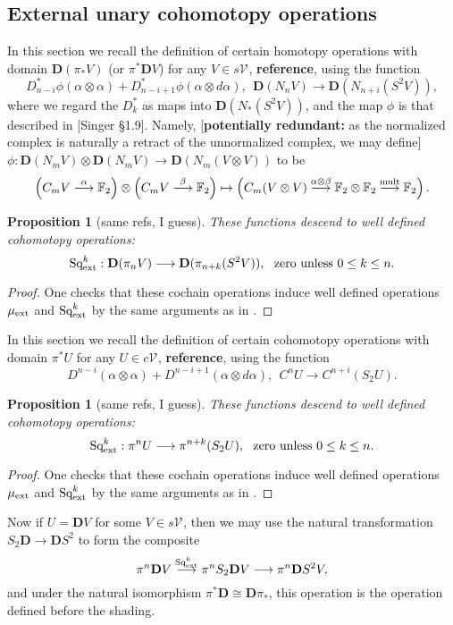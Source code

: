 \documentclass[11pt]{amsart}
\theoremstyle{plain}
\newtheorem{prop}[thm]{Proposition}
\theoremstyle{definition}
\let\oldphi\phi
\let\phi\varphi
\renewcommand{\to}{\longrightarrow}
\newcommand{\calV}{\mathcal{V}}
\theoremstyle{plain}
\newcommand{\vect}[2]{\calV^{#1}_{#2}}
\newcommand{\ExtCohOp}{\textup{Sq}_\textup{ext}}
\newcommand{\ExtCohProd}{\mu_\textup{ext}}
\newcommand{\F}{\mathbb{F}}
\newcommand{\dual}{\mathbf{D}}
\begin{document}
\begin{Constructing (co)homotopy operations}
\subsection{External unary cohomotopy operations}
In this section we recall the definition of certain homotopy operations with domain $\dual(\pi_*V)$ (or $\pi^*\dual V$) for any $V\in s\vect{}{}$, \textbf{reference}, using the function
\[D^*_{n-i}\oldphi(\alpha\otimes \alpha)+D^*_{n-i+1}\oldphi(\alpha\otimes d\alpha),\ \ \dual(N_nV) \to \dual(N_{n+i}(S^2V)),\]
where we regard the $D^*_k$ as maps into $\dual(N_*(S^2V))$, and the map $\oldphi$ is that described in [Singer \S1.9]. Namely, [\textbf{potentially redundant:} as the normalized complex is naturally a retract of the unnormalized complex, we may define] $\oldphi:\dual\left(N_mV\right)\otimes \dual\left(N_mV\right)\to \dual\left(N_m(V\otimes V)\right)$ to be
\[\left(C_mV\overset{\alpha}{\to}\F_2\right)\otimes \left(C_mV\overset{\beta}{\to}\F_2\right)\mapsto\left(C_m(V\otimes V)\overset{\alpha\otimes\beta}{\to}\F_2\otimes \F_2\overset{\textup{mult}}{\to}\F_2\right).\]
\begin{prop}[same refs, I guess]
These functions descend to  well defined cohomotopy operations:
\[\ExtCohOp^k:\dual(\pi_{n}V)\to \dual(\pi_{n+k}(S^2V)),\text{ \ zero unless $0\leq k\leq n$.}\]
\end{prop}
\begin{proof}
One checks that these cochain operations induce well defined operations $\ExtCohProd$ and $\ExtCohOp^k$ by the same arguments as in \cite[\S1.12]{MR2245560}.
\end{proof}

\begin{shaded}
In this section we recall the definition of certain cohomotopy operations with domain $\pi^*U$ for any $U\in c\vect{}{}$, \textbf{reference}, using the function
\[D^{n-i}(\alpha\otimes \alpha)+D^{n-i+1}(\alpha\otimes d\alpha),\ \ C^nU \to C^{n+i}(S_2U).\]
\begin{prop}[same refs, I guess] 
These functions descend to  well defined cohomotopy operations:
\[\ExtCohOp^k:\pi^{n}U\to \pi^{n+k}(S_2U),\text{ \ zero unless $0\leq k\leq n$.}\]
\end{prop}
\begin{proof}
One checks that these cochain operations induce well defined operations $\ExtCohProd$ and $\ExtCohOp^k$ by the same arguments as in \cite[\S1.12]{MR2245560}.
\end{proof}
Now if $U=\dual V$ for some $V\in s\vect{}{}$, then we may use the natural transformation $S_2\dual\to\dual S^2$ to form the composite
\[\pi^n\dual V\overset{\ExtCohOp^k}{\to}\pi^nS_2\dual V\to \pi^n\dual S^2V,\]
and under the natural isomorphism $\pi^*\dual\cong \dual\pi_*$, this operation is the operation defined before the shading.


\end{shaded}
\end{Constructing (co)homotopy operations}
\end{document}
